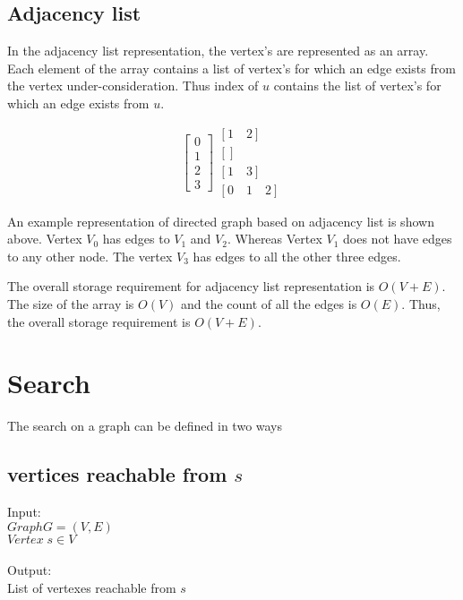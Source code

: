 \documentclass{article}
\begin{document}
\subsection{Adjacency list}

In the adjacency list representation, the vertex's are represented as an array. Each element of the array contains a list of vertex's for which an edge exists from the vertex under-consideration. Thus index of $u$ contains the list of vertex's for which an edge exists from $u$.

\begin{equation*}
	\begin{bmatrix}
		0\\
		1\\
		2\\
		3
	\end{bmatrix}
	\begin{matrix}
		[1 \quad 2]\\
		[  ]\\
		[1 \quad 3]\\
		[0 \quad 1 \quad 2]
	\end{matrix}
\end{equation*}

An example representation of directed graph based on adjacency list is shown above. Vertex $V_0$ has edges to $V_1$ and  $V_2$.  Whereas Vertex $V_1$ does not have edges to any other node.  The vertex $V_3$ has edges to all the other three edges.

The overall storage requirement for adjacency list representation is $O(V + E)$.  The size of the array is $O(V)$ and the count of all the edges is $O(E)$.  Thus, the overall storage requirement is $O(V+E)$.

\section{Search}

The search on a graph can be defined in two ways

\subsection{vertices reachable from $s$}

Input:\\
 		$Graph G = (V,E)$ \\
		$Vertex\; s \in V$\\
\\
Output:\\
List of vertexes reachable from $s$\\
\end{document}
